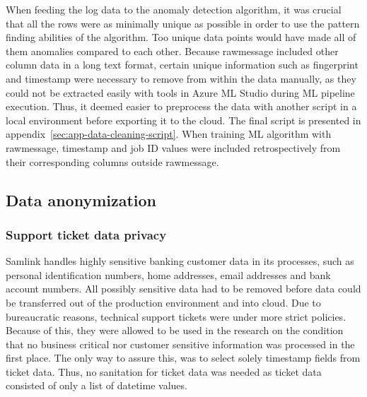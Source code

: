 When feeding the log data to the anomaly detection algorithm,
it was crucial that all the rows were as minimally unique as possible
in order to use the pattern finding abilities of the algorithm.
Too unique data points would have made all of them anomalies
compared to each other.
Because rawmessage included other column data in a long text format,
certain unique information such as fingerprint and timestamp
were necessary to remove from within the data manually,
as they could not be extracted easily
with tools in Azure ML Studio
during ML pipeline execution.
Thus,
it deemed easier to preprocess the data
with another script in a local environment
before exporting it to the cloud.
The final script is presented in appendix~\ref{sec:app-data-cleaning-script}.
When training ML algorithm with rawmessage,
timestamp and job ID values were included retrospectively
from their corresponding columns outside rawmessage.



\subsection{Data anonymization}\label{subsec:meth-data-anonymization}

\subsubsection*{Support ticket data privacy}
Samlink handles highly sensitive banking customer data in its processes,
such as personal identification numbers, home addresses, email addresses and bank account numbers.
All possibly sensitive data had to be removed
before data could be transferred out of the production environment and into cloud.
Due to bureaucratic reasons,
technical support tickets were under more strict policies.
Because of this,
they were allowed to be used in the research
on the condition that no business critical nor customer sensitive information
was processed in the first place.
The only way to assure this,
was to select solely timestamp fields from ticket data.
Thus, no sanitation for ticket data was needed
as ticket data consisted of only a list of datetime values.


